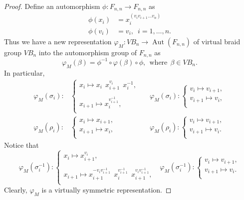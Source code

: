\documentclass[11 pt, reqno]{amsart}
\theoremstyle{definition}
\numberwithin{equation}{subsection}
\newcommand{\Aut}{\operatorname{Aut}}
\begin{document}
\begin{proof}
Define an automorphism $\phi: F_{n,n} \to F_{n,n}$ as
\begin{align*}
\phi(x_i)&=x_i ^{(v_i v_{i+1} \ldots v_n)}\\
\phi(v_i)&=v_i,\,\,\, i=1,\ldots,n.
\end{align*}
Thus we have a new representation $\varphi_M: VB_n \to \Aut(F_{n,n})$ of virtual braid group $VB_n$ into the automorphism group of $F_{n,n}$ as
$$
\varphi_M(\beta)=\phi^{-1} \circ \varphi(\beta) \circ \phi, ~~\textrm{where}~~ \beta \in VB_n.
$$
In particular,
\begin{align*}
\varphi_M(\sigma_i) :&
\left\{
\begin{array}{l}
  x_i \mapsto  x_i ~~x_{i+1}^{v_i}~~ x_i^{-1}, \\
\\
  x_{i+1} \mapsto x_i^{v_{i+1}^{-1}},  \\
\end{array}
\right.~~~
&\varphi_M(\sigma_i) :
\left\{
\begin{array}{l}
  v_i \mapsto  v_{i+1}, \\
  v_{i+1} \mapsto v_i,  \\
\end{array}
\right. \\
\varphi_M(\rho_i) :&
\left\{
\begin{array}{l}
  x_i \mapsto  x_{i+1}, \\
  x_{i+1} \mapsto x_i,  \\
\end{array}
\right.~~~
&\varphi_M(\rho_i) :
\left\{
\begin{array}{l}
  v_i \mapsto  v_{i+1}, \\
  v_{i+1} \mapsto v_i . \\
\end{array}
\right.
\end{align*}
Notice that
$$
\varphi_M(\sigma_i^{-1}) :
\left\{
\begin{array}{l}
  x_i \mapsto  x_{i+1}^{v_i}, \\
  \\
  x_{i+1} \mapsto x_{i+1} ^{-v_i v_{i+1} ^{-1}}~~ x_i^{v_{i+1} ^{-1}}~~ x_{i+1} ^{v_i v_{i+1}^{-1}},  \\
\end{array}
\right.~~~
\varphi_M(\sigma_i^{-1}) :
\left\{
\begin{array}{l}
  v_i \mapsto  v_{i+1}, \\
  v_{i+1} \mapsto v_i.  \\
\end{array}
\right.
$$
Clearly, $\varphi_M$ is a virtually symmetric representation.
\end{proof}
\end{document}
